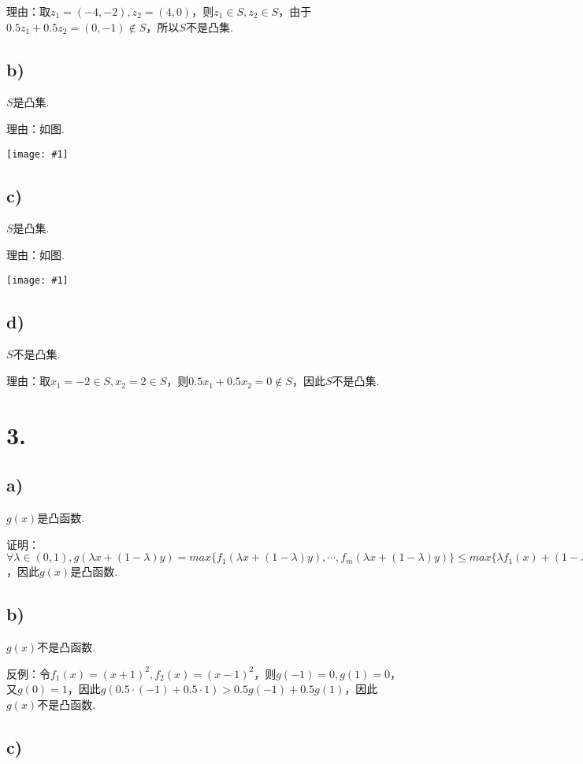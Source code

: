 \documentclass{article}
\newcommand{\p}[1]{\texttt{[image: \#1]}}
\begin{document}
	理由：取$z_1=(-4,-2), z_2=(4,0)$，则$z_1\in S, z_2\in S$，由于$0.5z_1+0.5z_2=(0, -1)\notin S$，所以$S$不是凸集.

	\subsection*{b)}
	
	$S$是凸集.
	
	理由：如图.
	
	\p{2-b}
	\subsection*{c)}
	
	$S$是凸集.
	
	理由：如图.
	
	\p{2-c}
	
	\subsection*{d)}
	
	$S$不是凸集.
	
	理由：取$x_1=-2\in S, x_2=2\in S$，则$0.5x_1+0.5x_2=0\notin S$，因此$S$不是凸集.

	\section*{3.}
	
	\subsection*{a)}
	
	$g(x)$是凸函数.
	
	证明：$\forall \lambda \in (0,1), g(\lambda x+(1-\lambda)y)=max\{f_1(\lambda x+(1-\lambda)y),\cdots, f_m(\lambda x+(1-\lambda)y)\}\leq max\{\lambda f_1(x)+(1-\lambda)f_1(y),\cdots, \lambda f_m(x)+(1-\lambda)f_m(y)\}\leq \lambda max\{f_1(x),\cdots,f_m(x)\}+(1-\lambda)max\{f_1(y),\cdots,f_m(y)\}\leq \lambda g(x)+(1-\lambda)g(y)$，因此$g(x)$是凸函数.
	\subsection*{b)}
	$g(x)$不是凸函数.
	
	反例：令$f_1(x)=(x+1)^2, f_2(x)=(x-1)^2$，则$g(-1)=0, g(1)=0$，又$g(0)=1$，因此$g(0.5\cdot (-1)+0.5\cdot 1) > 0.5g(-1)+0.5g(1)$，因此$g(x)$不是凸函数.
	
	\subsection*{c)}
	
\end{document}
